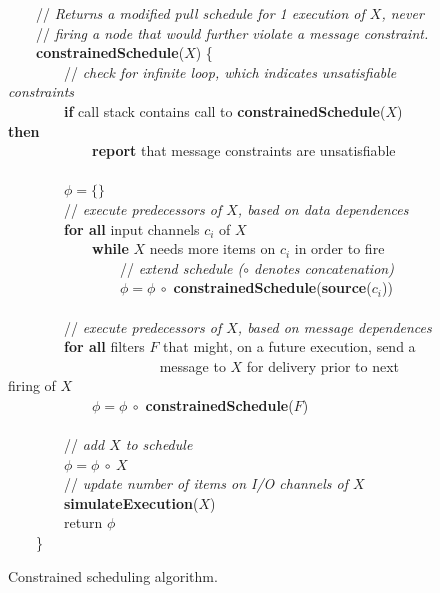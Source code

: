 \begin{figure}[t]
\begin{center}
\parbox{5in}{
\mbox{} ~~~~// {\it Returns a modified pull schedule for 1 execution of $X$, never}\\
\mbox{} ~~~~// {\it firing a node that would further violate a message constraint.} \\
\mbox{} ~~~~{\bf constrainedSchedule}($X$) \{\\
\mbox{} ~~~~~~~~// {\it check for infinite loop, which indicates unsatisfiable constraints}\\
\mbox{} ~~~~~~~~{\bf if} call stack contains call to {\bf constrainedSchedule}($X$) {\bf then}\\
\mbox{} ~~~~~~~~~~~~{\bf report} that message constraints are unsatisfiable\\
\mbox{}\\
\mbox{} ~~~~~~~~$\phi = \{ \}$ \\
\mbox{} ~~~~~~~~// {\it execute predecessors of $X$, based on data dependences} \\
\mbox{} ~~~~~~~~{\bf for all} input channels $c_i$ of $X$ \\
\mbox{} ~~~~~~~~~~~~{\bf while} $X$ needs more items on $c_i$ in order to fire \\
\mbox{} ~~~~~~~~~~~~~~~~// {\it extend schedule ($\circ$ denotes concatenation)} \\
\mbox{} ~~~~~~~~~~~~~~~~$\phi = \phi ~\circ$ {\bf constrainedSchedule}({\bf source}($c_i$)) \\
\mbox{}\\
\mbox{} ~~~~~~~~// {\it execute predecessors of $X$, based on message dependences} \\
\mbox{} ~~~~~~~~{\bf for all} filters $F$ that might, on a future execution, send a\\
\mbox{} ~~~~~~~~ ~~~~~~~~~~~~~message to $X$ for delivery prior to next firing of $X$ \\
\mbox{} ~~~~~~~~~~~~$\phi = \phi ~\circ$ {\bf constrainedSchedule}($F$) \\
\mbox{}\\
\mbox{} ~~~~~~~~// {\it add $X$ to schedule} \\
\mbox{} ~~~~~~~~$\phi = \phi~\circ~X$ \\
\mbox{} ~~~~~~~~// {\it update number of items on I/O channels of $X$} \\
\mbox{} ~~~~~~~~{\bf simulateExecution}($X$) \\
\mbox{} ~~~~~~~~return $\phi$ \\
\mbox{} ~~~~\}
}
\end{center}
\caption{Constrained scheduling algorithm.\protect\label{fig:constrained-scheduling}}
\end{figure}

